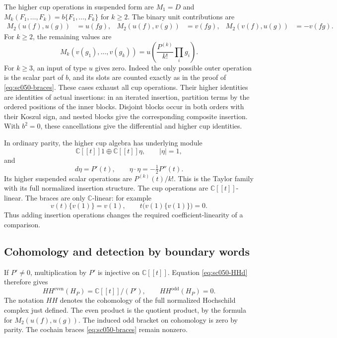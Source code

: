 The higher cup operations in suspended form are
\(M_1=D\) and \(M_k(F_1,\ldots,F_k)=b\{F_1,\ldots,F_k\}\)
for \(k\ge2\). The binary unit contributions are
\begin{align*}
 M_2(u(f),u(g))&=u(fg),&
 M_2(u(f),v(g))&=v(fg),&
 M_2(v(f),u(g))&=-v(fg).
\end{align*}
For \(k\ge2\), the remaining values are
\begin{equation}\label{eq:sc050-cups}
 M_k(v(g_1),\ldots,v(g_k))
       =u\left(\frac{P^{(k)}}{k!}\prod_i g_i\right).
\end{equation}
For \(k\ge3\), an input of type \(u\) gives zero.
Indeed the only possible outer operation is the scalar part
of \(b\), and its slots are counted exactly as in the proof
of \eqref{eq:sc050-braces}. These cases exhaust all cup operations.
Their higher identities are identities of actual insertions:
in an iterated insertion, partition terms by the ordered
positions of the inner blocks. Disjoint blocks occur in both
orders with their Koszul sign, and nested blocks give the
corresponding composite insertion. With \(b^2=0\), these
cancellations give the differential and higher cup identities.

In ordinary parity, the higher cup algebra has underlying module
\[
 \mathbb C[[t]]1\oplus\mathbb C[[t]]\eta,\qquad |\eta|=1,
\]
and
\begin{equation}\label{eq:sc050-Taylor}
 d\eta=P'(t),\qquad \eta\cdot\eta=-\tfrac12P''(t).
\end{equation}
Its higher suspended scalar operations are \(P^{(k)}(t)/k!\).
This is the Taylor family with its full normalized insertion
structure. The cup operations are \(\mathbb C[[t]]\)-linear.
The braces are only \(\mathbb C\)-linear: for example
\[
 v(t)\{v(1)\}=v(1),\qquad
 t\bigl(v(1)\{v(1)\}\bigr)=0.
\]
Thus adding insertion operations changes the required
coefficient-linearity of a comparison.

\subsection{Cohomology and detection by boundary words}

If \(P'\ne0\), multiplication by \(P'\) is injective on
\(\mathbb C[[t]]\). Equation \eqref{eq:sc050-HHd} therefore gives
\begin{equation}\label{eq:sc050-HH}
 HH^{\mathrm{even}}(H_P)=\mathbb C[[t]]/(P'),\qquad
 HH^{\mathrm{odd}}(H_P)=0.
\end{equation}
The notation \(HH\) denotes the cohomology of the full normalized
Hochschild complex just defined. The even product is the
quotient product, by the formula for \(M_2(u(f),u(g))\).
The induced odd bracket on cohomology is zero by parity.
The cochain braces \eqref{eq:sc050-braces} remain nonzero.

